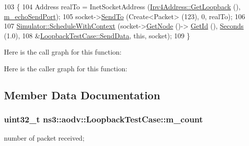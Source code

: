 \begin{DoxyCode}
103 \{
104   Address realTo = InetSocketAddress (\hyperlink{classns3_1_1Ipv4Address_a583a93499e0d947439794d7bd0c6366d}{Ipv4Address::GetLoopback} (), 
      \hyperlink{classns3_1_1aodv_1_1LoopbackTestCase_a7a72ecf604976b2c7cc6d4e1018c6edd}{m\_echoSendPort});
105   socket->\hyperlink{classns3_1_1Socket_af898fce6a58e0dbba23c1c6de1d4220e}{SendTo} (Create<Packet> (123), 0, realTo);
106 
107   \hyperlink{classns3_1_1Simulator_a86dbaef45a15a42365d7d2ae550449f6}{Simulator::ScheduleWithContext} (socket->\hyperlink{classns3_1_1Socket_aba642ad4301c1df47befc0aa9afa2e48}{GetNode} ()->
      \hyperlink{classns3_1_1Node_aaf49b64a843565ce3812326313b370ac}{GetId} (), \hyperlink{group__timecivil_ga33c34b816f8ff6628e33d5c8e9713b9e}{Seconds} (1.0),
108                                   &\hyperlink{classns3_1_1aodv_1_1LoopbackTestCase_a703cd6374b8b35680e0ac5c8bbb8a65c}{LoopbackTestCase::SendData}, \textcolor{keyword}{this}, socket);
109 \}
\end{DoxyCode}


Here is the call graph for this function\+:




Here is the caller graph for this function\+:




\subsection{Member Data Documentation}
\subsubsection[{\texorpdfstring{m\+\_\+count}{m_count}}]{\setlength{\rightskip}{0pt plus 5cm}uint32\+\_\+t ns3\+::aodv\+::\+Loopback\+Test\+Case\+::m\+\_\+count\hspace{0.3cm}{\ttfamily [private]}}\hypertarget{classns3_1_1aodv_1_1LoopbackTestCase_af09bb519a38083fa17fc3560b46f480a}{}\label{classns3_1_1aodv_1_1LoopbackTestCase_af09bb519a38083fa17fc3560b46f480a}


number of packet received; 

